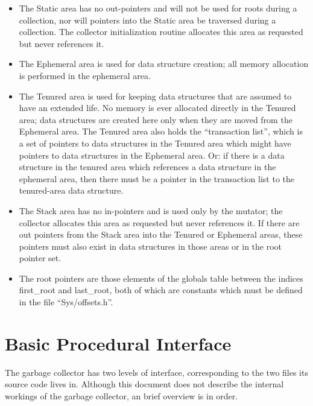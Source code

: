 \begin{itemize}
\item
The Static area has no out-pointers and will not be used for roots during a
collection, nor will pointers into the Static area be traversed during a
collection. The collector initialization routine allocates this area as
requested but never references it.

\item
The Ephemeral area is used for data structure creation; all memory 
allocation is performed in the ephemeral area.

\item
The Tenured area is used for keeping data structures that are assumed to
have an extended life. No memory is ever allocated directly in the Tenured
area; data structures are created here only when they are moved from the
Ephemeral area. The Tenured area also holds the ``transaction list'', which
is a set of pointers to data structures in the Tenured area which might have
pointers to data structures in the Ephemeral area. Or: if there is a data
structure in the tenured area which references a data structure in the
ephemeral area, then there must be a pointer in the transaction list to the
tenured-area data structure.

\item
The Stack area has no in-pointers and is used only by the mutator; the
collector allocates this area as requested but never references it. If there
are out pointers from the Stack area into the Tenured or Ephemeral areas,
these pointers must also exist in data structures in those areas or in the
root pointer set.

\item
The root pointers are those elements of the globals table between the indices
{\sc first\_root} and {\sc last\_root}, both of which are constants
which must be defined in the file ``Sys/offsets.h''.

\end{itemize}


\section{Basic Procedural Interface}

The garbage collector has two levels of interface, corresponding to the
two files its source code lives in. Although this document does not
describe the internal workings of the garbage collector, an brief overview
is in order.

